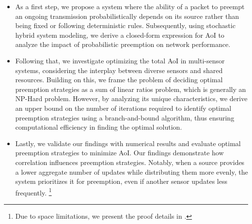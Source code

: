 

\begin{itemize}
    \item As a first step, we propose a system where the ability of a packet to preempt an ongoing transmission probabilistically depends on its source rather than being fixed or following deterministic rules. Subsequently, using stochastic hybrid system modeling, we derive a closed-form expression for AoI to analyze the impact of probabilistic preemption on network performance.
    

    \item Following that, we investigate optimizing the total AoI in multi-sensor systems, considering the interplay between diverse sensors and shared resources. Building on this, we frame the problem of deciding optimal preemption strategies as a sum of linear ratios problem, which is generally an NP-Hard problem\cite{freund2001solving}. However, by analyzing its unique characteristics, we derive an upper bound on the number of iterations required to identify optimal preemption strategies using a branch-and-bound algorithm, thus ensuring computational efficiency in finding the optimal solution.
    \item Lastly, we validate our findings with numerical results and evaluate optimal preemption strategies to minimize AoI. Our findings demonstrate how correlation influences preemption strategies. Notably, when a source provides a lower aggregate number of updates while distributing them more evenly, the system prioritizes it for preemption, even if another sensor updates less frequently.
{}
{\footnote{Due to space limitations, we present the proof details in \cite{technicalNote}.}}
\end{itemize}


